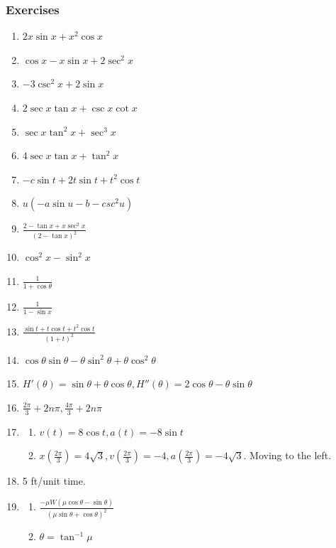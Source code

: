 \documentclass{article}
\begin{document}
\subsubsection*{Exercises}
\begin{enumerate}
  \item $2x\sin{x}+x^2\cos{x}$
  \item $\cos{x}-x\sin{x}+2\sec^2{x}$
  \item $-3\csc^2{x}+2\sin{x}$
  \item $2\sec{x}\tan{x}+\csc{x}\cot{x}$
  \item $\sec{x}\tan^2{x}+\sec^3{x}$
  \item $4\sec{x}\tan{x}+\tan^2{x}$
  \item $-c\sin{t}+2t\sin{t}+t^2\cos{t}$
  \item $u(-a\sin{u}-b-csc^2{u})$
  \item $\frac{2-\tan{x}+x\sec^2{x}}{(2-\tan{x})^2}$
  \item $\cos^2{x}-\sin^2{x}$
  \item $\frac{1}{1+\cos\theta}$
  \item $\frac{1}{1-\sin{x}}$
  \item $\frac{\sin{t}+t\cos{t}+t^2\cos{t}}{(1+t)^2}$
    \setcounter{enumi}{14}
  \item $\cos\theta\sin\theta-\theta\sin^2\theta+\theta\cos^2\theta$
    \setcounter{enumi}{28}
  \item $H'(\theta) = \sin\theta+\theta\cos\theta, H''(\theta)=2\cos\theta-\theta\sin\theta$
    \setcounter{enumi}{32}
  \item $\frac{2\pi}{3}+2n\pi, \frac{4\pi}{3}+2n\pi$
    \setcounter{enumi}{34}
  \item
    \begin{enumerate}
      \item $v(t)=8\cos{t}, a(t)=-8\sin{t}$
      \item $x\left(\frac{2\pi}{3}\right)=4\sqrt{3},v\left(\frac{2\pi}{3}\right)=-4,
        a\left(\frac{2\pi}{3}\right)=-4\sqrt{3}$. Moving to the left.
    \end{enumerate}
    \setcounter{enumi}{36}
  \item 5 ft/unit time.
  \item
    \begin{enumerate}
      \item $\frac{-\mu{W}(\mu\cos\theta-\sin\theta)}{(\mu\sin\theta+\cos\theta)^2}$
      \item $\theta=\tan^{-1}\mu$
    \end{enumerate}

\end{enumerate}
\end{document}
